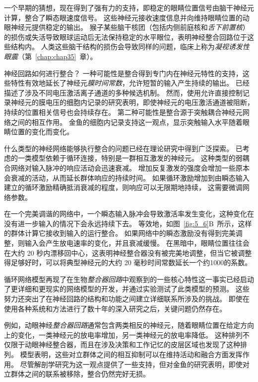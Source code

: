 一个早期的猜想，现在得到了强有力的支持，即稳定的眼睛位置信号由脑干神经元计算，整合了瞬态眼速度信号。
这些神经元接收速度信息并向维持眼睛位置的动眼神经元提供稳定的输出。
猴子某些脑干核团（包括内侧前庭核和\textit{舌下前置核}）的损伤或失活导致眼球运动后无法保持稳定的水平眼位，表明神经整合回路位于这些结构内。
人类这些脑干结构的损伤会导致同样的问题，临床上称为\textit{凝视诱发性眼震}（第~\ref{chap:chap35}~章）。


神经回路如何进行整合？
一种可能性是整合得到专门内在神经元特性的支持，这些特性有效地延长了神经元\textit{膜时间常数}，允许短暂的输入产生持续的输出。
已经描述了涉及不同电压激活离子通道的多种候选机制。 
然而，使用允许直接控制记录神经元的膜电压的细胞内记录的研究表明，即使神经元的电压激活通道被阻断，持续的位置相关信号也会持续存在。 
第二种可能性是整合源于突触耦合神经元网络之间的相互作用。 
金鱼的细胞内记录支持这一观点，显示突触输入水平随着眼睛位置的变化而变化。


什么类型的神经网络能够执行整合的问题已经在理论研究中得到广泛探索。
已考虑的一类模型依赖于循环连接，特别是一群相互激发的神经元。 
这种类型的弱耦合网络对输入脉冲的响应活动会迅速衰减。
增加反复激发的强度会增加一些原本会衰减的活动，从而延长群体响应的持续时间。
如果循环激励增加到由瞬态输入建立的循环激励精确抵消衰减的程度，则响应可以无限期地持续，
这需要微调网络参数。


在一个完美调谐的网络中，一个瞬态输入脉冲会导致激活率发生变化，这种变化在没有进一步输入的情况下会永远持续下去。 
等效地，如图~\ref{fig:5_6}B~所示，这样的群体计算它接收到输入的运行整合。
如果网络中的瞬态激励没有得到完美调整，则输入会产生放电速率的变化，并且衰减缓慢。
在黑暗中，眼睛位置往往会在大约 20 秒内漂移回中心，这表明神经整合器没有被完美地调整，但当它被调整得足够好时，可以将典型神经元的大约 20 毫秒时间常数延长一个约1000的系数。


循环网络模型再现了在生物\textit{整合器回路}中观察到的一些核心特性这一事实已经启动了更详细和更现实的网络模型的开发，并通过实验测试了此类模型的预测。
这些努力还突出了在神经回路的结构和功能之间建立详细联系所涉及的挑战。
即使在使用各种系统和方法进行了数十年的深入研究之后，关键问题仍然存在。


例如，动眼神经\textit{整合器回路}通常包含两类相反的神经元，随着眼睛位置在给定方向上的变化，一类神经元的放电率增加，另一类神经元的放电率降低。
这种排列不仅限于动眼神经整合器，而且在涉及决策和工作记忆的皮层区域也发现了这种排列。
模型表明，这些对立群体之间的相互抑制可以在维持活动和融合方面发挥作用。 
尽管解剖学研究为这一观点提供了一些支持，但对金鱼的研究表明，即使对立群体之间的联系被移除，整合仍然完好无损。



